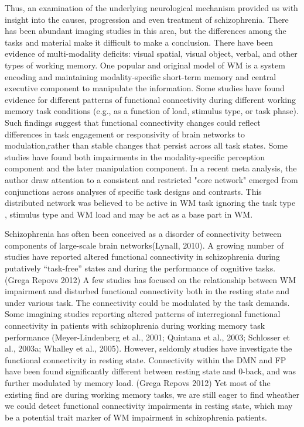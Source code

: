 \documentclass[preprint,authoryear,review,12pt]{elsarticle}
\begin{document}
Thus, an examination of the underlying neurological mechanism provided us with insight into the causes, progression and even treatment of schizophrenia. There has been abundant imaging studies in this area, but the differences among the tasks and material make it difficult to make a conclusion. There have been evidence of multi-modality deficits: visual spatial, visual object, verbal, and other types of working memory. One popular and original model of WM is a system encoding and maintaining modality-specific short-term memory and central executive component to manipulate the information. Some studies have found evidence for different patterns of functional connectivity during different working memory task conditions (e.g., as a function of load, stimulus type, or task phase).  Such findings suggest that functional connectivity changes could reflect differences in task engagement or responsivity of brain networks to modulation,rather than stable changes that persist across all task states. Some studies have found both impairments in the modality-specific perception component and the later manipulation component. In a recent meta analysis, the author draw attention to a consistent and restricted "core network" emerged from conjunctions across analyses of specific task designs and contrasts. This distributed network was believed to be active in WM task ignoring the task type , stimulus type and WM load and may be act as a base part in WM. 

Schizophrenia has often been conceived as a disorder of connectivity between components of large-scale brain networks(Lynall, 2010). A growing number of studies have reported altered functional connectivity in schizophrenia during putatively “task-free” states and during the performance of cognitive tasks. (Grega Repovs 2012)  A few studies has focused on the relationship between WM impairment and disturbed functional connectivity both in the resting state and under various task. The connectivity could be modulated by the task demands. Some imagining studies reporting altered patterns of interregional functional connectivity in patients with schizophrenia during working memory task performance (Meyer-Lindenberg et al., 2001; Quintana et al., 2003; Schlosser et al., 2003a; Whalley et al., 2005). However, seldomly studies have investigate the functional connectivity in resting state. Connectivity within the DMN and FP have been found significantly different between resting state and 0-back, and was further modulated by memory load. (Grega Repovs 2012) Yet most of the existing find are during working memory tasks, we are still eager to find wheather we could detect functional connectivity impairments in resting state, which may be a potential trait marker of WM impairment in schizophrenia patients.
\end{document}
